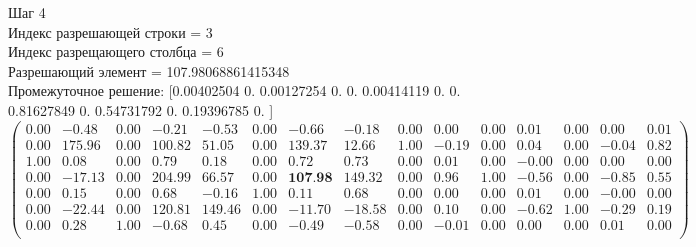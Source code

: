 \documentclass{article}
\begin{document}
\begin{flushleft}
    Шаг 4\\
    Индекс разрешающей строки = 3\\
    Индекс разрещающего столбца = 6\\
    Разрешающий элемент = 107.98068861415348\\
    Промежуточное решение:
    [0.00402504 0.         0.00127254 0.         0.         0.00414119
    0.         0.         0.81627849 0.         0.54731792 0.
    0.19396785 0.        ]
\begin{equation*}
\begin{pmatrix}
 0.00 &  -0.48 & 0.00 &  -0.21 &  -0.53 & 0.00 &  -0.66 &  -0.18 & 0.00 &  0.00 & 0.00 &  0.01 & 0.00 &  0.00 & 0.01 \\
 0.00 & 175.96 & 0.00 & 100.82 &  51.05 & 0.00 & 139.37 &  12.66 & 1.00 & -0.19 & 0.00 &  0.04 & 0.00 & -0.04 & 0.82 \\
 1.00 &   0.08 & 0.00 &   0.79 &   0.18 & 0.00 &   0.72 &   0.73 & 0.00 &  0.01 & 0.00 & -0.00 & 0.00 &  0.00 & 0.00 \\
 0.00 & -17.13 & 0.00 & 204.99 &  66.57 & 0.00 & \textbf{107.98} & 149.32 & 0.00 &  0.96 & 1.00 & -0.56 & 0.00 & -0.85 & 0.55 \\
 0.00 &   0.15 & 0.00 &   0.68 &  -0.16 & 1.00 &   0.11 &   0.68 & 0.00 &  0.00 & 0.00 &  0.01 & 0.00 & -0.00 & 0.00 \\
 0.00 & -22.44 & 0.00 & 120.81 & 149.46 & 0.00 & -11.70 & -18.58 & 0.00 &  0.10 & 0.00 & -0.62 & 1.00 & -0.29 & 0.19 \\
 0.00 &   0.28 & 1.00 &  -0.68 &   0.45 & 0.00 &  -0.49 &  -0.58 & 0.00 & -0.01 & 0.00 &  0.00 & 0.00 &  0.01 & 0.00 \\
\end{pmatrix}
\end{equation*}
\end{flushleft}
\end{document}
